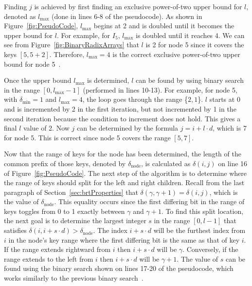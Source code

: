 \documentclass{sig-alternate}
\begin{document}
Finding $j$ is achieved by first finding an exclusive power-of-two upper bound for $l$, denoted as $l_{\textrm{max}}$ (done in lines 6-8 of the pseudocode). As shown in Figure~\ref{fig:PseudoCode}, $l_{\textrm{max}}$ begins at 2 and is doubled until it becomes the upper bound for $l$. For example, for $I_5$, $l_{\textrm{max}}$ is doubled until it reaches 4. We can see from Figure~\ref{fig:BinaryRadixArrays} that $l$ is 2 for node 5 since it covers the keys $[5,5+2]$. Therefore, $l_{\textrm{max}}=4$ is the correct exclusive power-of-two upper bound for node 5~\cite{Karras:2012}.

Once the upper bound $l_{\textrm{max}}$ is determined, $l$ can be found by using binary search in the range $[0,l_{\textrm{max}}-1]$ (performed in lines 10-13). For example, for node 5, with $\delta_{\textrm{min}}=1$ and $l_{\textrm{max}}=4$, the loop goes through the range \{$2, 1$\}. $l$ starts at 0 and is incremented by 2 in the first iteration, but not incremented by 1 in the second iteration because the condition to increment does not hold. This gives a final $l$ value of 2. Now $j$ can be determined by the formula $j=i+l \cdot d$, which is 7 for node 5. This is correct since node 5 covers the range $[5, 7]$.

Now that the range of keys for the node has been determined, the length of the common prefix of those keys, denoted by $\delta_{\textrm{node}}$, is calculated as $\delta(i,j)$ on line 16 of Figure~\ref{fig:PseudoCode}. The next step of the algorithm is to determine where the range of keys should split for the left and right children. Recall from the last paragraph of Section~\ref{sec:brtProperties} that $\delta(\gamma,\gamma+1)=\delta(i,j)$, which is the value of $\delta_{\textrm{node}}$. This equality occurs since the first differing bit in the range of keys toggles from 0 to 1 exactly between $\gamma$ and $\gamma+1$. To find this split location, the next goal is to determine the largest integer $s$ in the range $[0, l-1]$ that satisfies $\delta(i, i+s \cdot d) > \delta_{\textrm{node}}$. The index $i+s \cdot d$ will be the furthest index from $i$ in the node's key range where the first differing bit is the same as that of key $i$. If the range extends rightward from $i$ then $i+s \cdot d$ will be $\gamma$. Conversely, if the range extends to the left from $i$ then $i+s \cdot d$ will be $\gamma+1$. The value of $s$ can be found using the binary search shown on lines 17-20 of the pseudocode, which works similarly to the previous binary search~\cite{Karras:2012}.
\end{document}
